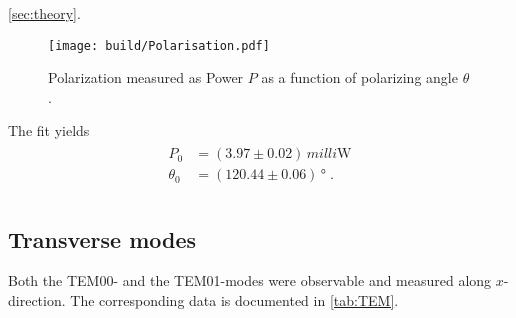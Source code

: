    \autoref{sec:theory}. %
   \begin{figure}
      \centering
      \texttt{[image: build/Polarisation.pdf]}
      \caption{Polarization measured as Power $P$ as a function of polarizing angle $\theta$.}
      \label{fig:polarization}
   \end{figure}
   The fit yields 
   \begin{align}
      \begin{split}
         P_0&=(3.97\pm0.02)\,\unit{milli\watt} \\
         \theta_0&=(120.44\pm0.06)\,\unit{\degree}\;. \\
         \label{eq:polarization_fit}
      \end{split}
   \end{align}
   
   \subsection{Transverse modes}
   Both the TEM00- and the TEM01-modes were observable and measured along $x$-direction. 
   The corresponding data is documented in \autoref{tab:TEM}. 
   
